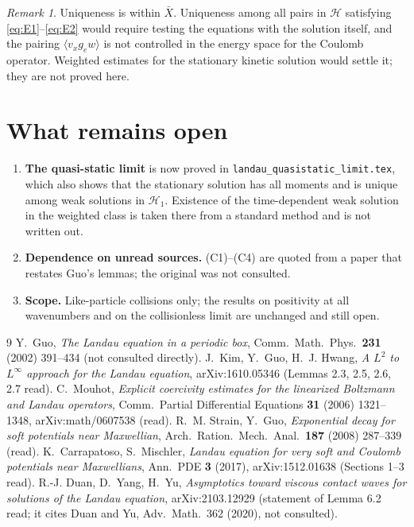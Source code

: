 \documentclass[11pt]{article}
\newcommand{\cH}{\mathcal{H}}
\newcommand{\avg}[1]{\langle #1\rangle}
\theoremstyle{remark}
\newtheorem{remark}[theorem]{Remark}
\begin{document}
\begin{remark}
Uniqueness is within $\bar X$. Uniqueness among all pairs in $\cH$ satisfying
\eqref{eq:E1}--\eqref{eq:E2} would require testing the equations with the
solution itself, and the pairing $\avg{v_xg_ew}$ is not controlled in the
energy space for the Coulomb operator. Weighted estimates for the stationary
kinetic solution would settle it; they are not proved here.
\end{remark}

\section{What remains open}

\begin{enumerate}
  \item \textbf{The quasi-static limit} is now proved in
    \texttt{landau\_quasistatic\_limit.tex}, which also shows that the
    stationary solution has all moments and is unique among weak solutions
    in $\cH_1$. Existence of the time-dependent weak solution in the
    weighted class is taken there from a standard method and is not written
    out.
  \item \textbf{Dependence on unread sources.} (C1)--(C4) are quoted from a
    paper that restates Guo's lemmas; the original was not consulted.
  \item \textbf{Scope.} Like-particle collisions only; the results on
    positivity at all wavenumbers and on the collisionless limit are
    unchanged and still open.
\end{enumerate}

\begin{thebibliography}{9}
 Y.~Guo, \emph{The Landau equation in a periodic box}, Comm.\
Math.\ Phys.\ \textbf{231} (2002) 391--434 (not consulted directly).
\bibitem{KGH} J.~Kim, Y.~Guo, H.~J. Hwang, \emph{A $L^2$ to $L^\infty$
approach for the Landau equation}, arXiv:1610.05346 (Lemmas 2.3, 2.5, 2.6,
2.7 read).
 C.~Mouhot, \emph{Explicit coercivity estimates for the
linearized Boltzmann and Landau operators}, Comm.\ Partial Differential
Equations \textbf{31} (2006) 1321--1348, arXiv:math/0607538 (read).
\bibitem{StrainGuo} R.~M. Strain, Y.~Guo, \emph{Exponential decay for soft
potentials near Maxwellian}, Arch.\ Ration.\ Mech.\ Anal.\ \textbf{187}
(2008) 287--339 (read).
 K.~Carrapatoso, S.~Mischler, \emph{Landau equation for very
soft and Coulomb potentials near Maxwellians}, Ann.\ PDE \textbf{3} (2017),
arXiv:1512.01638 (Sections 1--3 read).
 R.-J. Duan, D.~Yang, H.~Yu, \emph{Asymptotics toward viscous
contact waves for solutions of the Landau equation}, arXiv:2103.12929
(statement of Lemma 6.2 read; it cites Duan and Yu, Adv.\ Math.\ 362 (2020),
not consulted).
\end{thebibliography}
\end{document}
